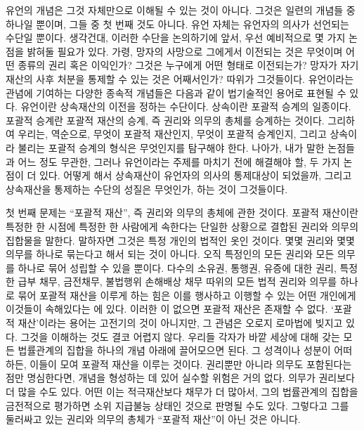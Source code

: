 유언의 개념은 그것 자체만으로 이해될 수 있는 것이 아니다.
그것은 일련의 개념들 중 하나일 뿐이며, 그들 중 첫 번째 것도 아니다.
유언 자체는 유언자의 의사가 선언되는 수단일 뿐이다.
생각건대,
이러한 수단을 논의하기에 앞서,
우선 예비적으로 몇 가지 논점을 밝혀둘 필요가 있다.
가령, 망자의 사망으로 그에게서 이전되는 것은 무엇이며 어떤 종류의
권리 혹은 이익인가? 그것은 누구에게 어떤 형태로 이전되는가?
망자가 자기 재산의 사후 처분을 통제할 수 있는 것은 어째서인가?
따위가 그것들이다.
유언이라는 관념에 기여하는 다양한 종속적 개념들은 다음과 같이 법기술적인
용어로 표현될 수 있다.
유언이란 상속재산의 이전을 정하는 수단이다.
상속이란 포괄적 승계의 일종이다.
포괄적 승계란 포괄적 재산의 승계, 즉
권리와 의무의 총체를 승계하는 것이다.
그리하여 우리는, 역순으로,
무엇이 포괄적 재산인지, 무엇이 포괄적 승계인지,
그리고 상속이라 불리는 포괄적 승계의 형식은 무엇인지를 탐구해야 한다.
나아가, 내가 말한 논점들과 어느 정도 무관한, 그러나
유언이라는 주제를 마치기 전에 해결해야 할, 두 가지 논점이 더 있다.
어떻게 해서 상속재산이 유언자의 의사의 통제대상이 되었을까,
그리고 상속재산을 통제하는 수단의 성질은 무엇인가, 하는 것이 그것들이다.

첫 번째 문제는 ``포괄적 재산'',
즉 권리와 의무의 총체에 관한 것이다.
포괄적 재산이란
특정한 한 시점에 특정한 한 사람에게 속한다는 단일한 상황으로 결합된
권리와 의무의 집합물을 말한다.
말하자면 그것은 특정 개인의 법적인 옷\hanja{[衣服]}인 것이다.
몇몇 권리와 몇몇 의무를 하나로 묶는다고 해서 되는 것이 아니다.
오직 특정인의 모든 권리와 모든 의무를 하나로 묶어 성립할 수 있을 뿐이다.
다수의 소유권, 통행권, 유증에 대한 권리, 특정한 급부 채무, 금전채무,
불법행위 손해배상 채무 따위의 모든 법적 권리와 의무를 하나로 묶어
포괄적 재산을 이루게 하는 힘은
이를 행사하고 이행할 수 있는 어떤 개인에게
이것들이
속해있다는
에 있다.
이러한 이 없으면 포괄적 재산은 존재할 수 없다.
`포괄적 재산'이라는 용어는 고전기의 것이 아니지만,
그 관념은 오로지 로마법에 빚지고 있다.
그것을 이해하는 것도 결코 어렵지 않다.
우리들 각자가 바깥 세상에 대해 갖는 모든 법률관계의 집합을
하나의 개념 아래에 끌어모으면 된다.
그 성격이나 성분이 어떠하든, 이들이 모여 포괄적 재산을 이루는 것이다.
권리뿐만 아니라 의무도 포함된다는 점만 명심한다면,
개념을 형성하는 데 있어 실수할 위험은 거의 없다.
의무가 권리보다 더 많을 수도 있다.
어떤 이는 적극재산보다 채무가 더 많아서,
그의 법률관계의 집합을 금전적으로 평가하면 소위 지급불능 상태인 것으로
판명될 수도 있다.
그렇다고 그를 둘러싸고 있는 권리와 의무의 총체가
``포괄적 재산''이 아닌 것은 아니다.

